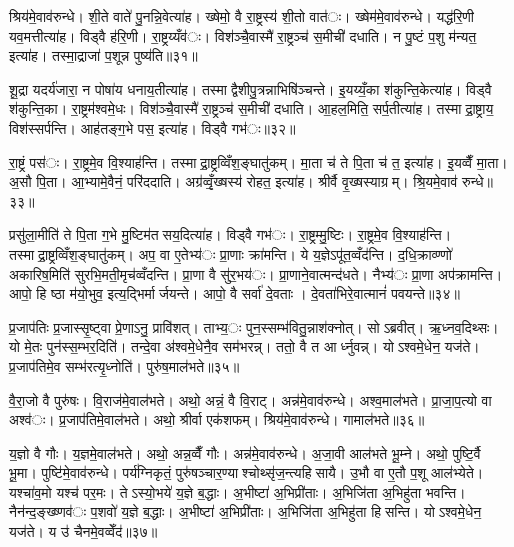 श्रिय॑मे॒वाव॑रुन्धे। शी॒ते वाते॑ पु॒नन्नि॒वेत्या॑ह। ख्षेमो॒ वै रा॒ष्ट्रस्य॑ शी॒तो वात॑ः। ख्षेम॑मे॒वाव॑रुन्धे। यद्ध॑रि॒णी यव॒मत्तीत्या॑ह। विड्वै ह॑रि॒णी। रा॒ष्ट्रय्यँव॑ः। विश॑ञ्चै॒वास्मै॑ रा॒ष्ट्रञ्च॑ स॒मीची॑ दधाति। न पु॒ष्टं प॒शु म॑न्यत॒ इत्या॑ह। तस्मा॒द्राजा॑ प॒शून्न पुष्य॑ति॥३१॥

शू॒द्रा यदर्य॑जारा॒ न पोषा॑य धनाय॒तीत्या॑ह। तस्माद्वैशीपु॒त्रन्नाभिषि॑ञ्चन्ते। इ॒यय्यँ॒का श॑कुन्ति॒केत्या॑ह। विड्वै श॑कुन्ति॒का। रा॒ष्ट्रम॑श्वमे॒धः। विश॑ञ्चै॒वास्मै॑ रा॒ष्ट्रञ्च॑ स॒मीची॑ दधाति। आ॒हल॒मिति॒ सर्प॒तीत्या॑ह। तस्माद्रा॒ष्ट्राय॒ विश॑स्सर्पन्ति। आह॑तङ्ग॒भे पस॒ इत्या॑ह। विड्वै गभ॑ः॥३२॥

रा॒ष्ट्रं पस॑ः। रा॒ष्ट्रमे॒व वि॒श्याह॑न्ति। तस्माद्रा॒ष्ट्रव्विँश॒ङ्घातु॑कम्। मा॒ता च॑ ते पि॒ता च॑ त॒ इत्या॑ह। इ॒यव्वैँ मा॒ता। अ॒सौ पि॒ता। आ॒भ्यामे॒वैनं॒ परि॑ददाति। अग्र॑व्वृँ॒ख्षस्य॑ रोहत॒ इत्या॑ह। श्रीर्वै वृ॒ख्षस्याग्रम्। श्रि॒यमे॒वाव॑ रुन्धे॥३३॥

प्रसु॑ला॒मीति॑ ते पि॒ता ग॒भे मु॒ष्टिम॑तसय॒दित्या॑ह। विड्वै गभ॑ः। रा॒ष्ट्रम्मु॒ष्टिः। रा॒ष्ट्रमे॒व वि॒श्याह॑न्ति। तस्माद्रा॒ष्ट्रव्विँश॒ङ्घातु॑कम्। अप॒ वा ए॒तेभ्य॑ः प्रा॒णाः क्रा॑मन्ति। ये य॒ज्ञेऽपू॑त॒व्वँद॑न्ति। द॒धि॒क्राव्ण्णो॑ अकारिष॒मिति॑ सुरभि॒मती॒मृच॑व्वँदन्ति। प्रा॒णा वै सु॑र॒भय॑ः। प्रा॒णाने॒वात्मन्द॑धते। नैभ्य॑ः प्रा॒णा अप॑क्रामन्ति। आपो॒ हि ष्ठा म॑यो॒भुव॒ इत्य॒द्भिर्मार्जयन्ते। आपो॒ वै सर्वा॑ दे॒वताः। दे॒वता॑भिरे॒वात्मानं॑ पवयन्ते॥३४॥


प्र॒जाप॑तिः प्र॒जास्सृ॒ष्ट्वा प्रे॒णाऽनु॒ प्रावि॑शत्। ताभ्य॒ः पुन॒स्सम्भ॑वितु॒न्नाश॑क्नोत्। सोऽब्रवीत्। ऋ॒ध्नव॒दिथ्सः। यो मे॒तः पुन॑स्स॒म्भर॒दिति॑। तन्दे॒वा अ॑श्वमे॒धेनै॒व सम॑भरन्न्। ततो॒ वै त आर्ध्नुवन्न्। योऽश्वमे॒धेन॒ यज॑ते। प्र॒जाप॑तिमे॒व सम्भ॑रत्यृ॒ध्नोति॑। पुरु॑ष॒माल॑भते॥३५॥

वै॒रा॒जो वै पुरु॑षः। वि॒राज॑मे॒वाल॑भते। अथो॒ अन्नं॒ वै वि॒राट्। अन्न॑मे॒वाव॑रुन्धे। अश्व॒माल॑भते। प्रा॒जा॒प॒त्यो वा अश्व॑ः। प्र॒जाप॑तिमे॒वाल॑भते। अथो॒ श्रीर्वा एक॑शफम्। श्रिय॑मे॒वाव॑रुन्धे। गामाल॑भते॥३६॥

य॒ज्ञो वै गौः। य॒ज्ञमे॒वाल॑भते। अथो॒ अन्न॒व्वैँ गौः। अन्न॑मे॒वाव॑रुन्धे। अ॒जा॒वी आल॑भते भू॒म्ने। अथो॒ पुष्टि॒र्वै भू॒मा। पुष्टि॑मे॒वाव॑रुन्धे। पर्य॑ग्निकृतं॒ पुरु॑षञ्चार॒ण्याश्चोथ्सृ॑ज॒न्त्यहिसायै। उ॒भौ वा ए॒तौ प॒शू आल॑भ्येते। यश्चा॑व॒मो यश्च॑ पर॒मः। तेऽस्यो॒भये॑ य॒ज्ञे ब॒द्धाः। अ॒भीष्टा॑ अ॒भिप्री॑ताः। अ॒भिजि॑ता अ॒भिहु॑ता भवन्ति। नैन॑न्द॒ङ्ख्ष्णव॑ः प॒शवो॑ य॒ज्ञे ब॒द्धाः। अ॒भीष्टा॑ अ॒भिप्री॑ताः। अ॒भिजि॑ता अ॒भिहु॑ता हिसन्ति। योऽश्वमे॒धेन॒ यज॑ते। य उ॑ चैनमे॒वव्वेँद॑॥३७॥

